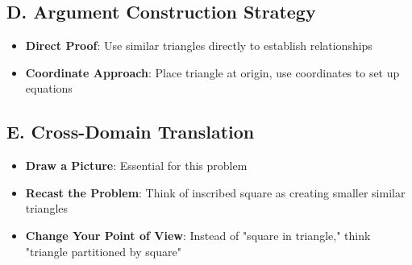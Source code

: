 \documentclass[]{article}
\begin{document}
\begin{strategicbox}
\subsection*{D. Argument Construction Strategy}
\begin{itemize}[leftmargin=*]
    \item \textbf{Direct Proof}: Use similar triangles directly to establish relationships
    \item \textbf{Coordinate Approach}: Place triangle at origin, use coordinates to set up equations
\end{itemize}

\subsection*{E. Cross-Domain Translation}
\begin{itemize}[leftmargin=*]
    \item \textbf{Draw a Picture}: Essential for this problem
    \item \textbf{Recast the Problem}: Think of inscribed square as creating smaller similar triangles
    \item \textbf{Change Your Point of View}: Instead of "square in triangle," think "triangle partitioned by square"
\end{itemize}
\end{strategicbox}
\end{document}
